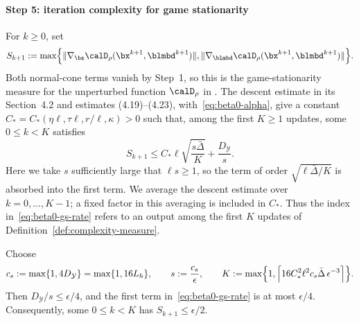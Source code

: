 \paragraph{Step 5: iteration complexity for game stationarity}
For \(k\ge0\), set
\[
S_{k+1}:=\max\Bigl\{
\|\nabla_{\bx}\calD_\rho(\bx^{k+1},\blmbd^{k+1})\|,
\|\nabla_{\blmbd}\calD_\rho(\bx^{k+1},\blmbd^{k+1})\|\Bigr\}.
\]
Both normal-cone terms vanish by Step~1, so this is the game-stationarity
measure for the unperturbed function \(\calD_\rho\) in
\cite[Theorem~3.3(i)]{li2026smoothing}.
The descent estimate in its Section~4.2 and estimates (4.19)--(4.23),
with~\eqref{eq:beta0-alpha}, give a constant
\(C_*=C_*(\eta\ell,\tau\ell,r/\ell,\kappa)>0\) such that, among the first
\(K\ge1\) updates, some \(0\le k<K\) satisfies
\begin{equation}
S_{k+1}\le C_*\ell\sqrt{\frac{s\bar\Delta}{K}}
+\frac{D_{\mathcal Y}}s.
\label{eq:beta0-gs-rate}
\end{equation}
Here we take \(s\) sufficiently large that \(\ell s\ge1\), so the
term of order \(\sqrt{\ell\bar\Delta/K}\) is absorbed into the first
term. We average the descent estimate over \(k=0,\ldots,K-1\);
a fixed factor in this averaging is included in \(C_*\).
Thus the index in~\eqref{eq:beta0-gs-rate} refers to an output among the
first \(K\) updates of Definition~\ref{def:complexity-measure}.

Choose
\begin{equation}
c_s:=\max\{1,4D_{\mathcal Y}\}=\max\{1,16L_h\},\qquad
s:=\frac{c_s}{\epsilon},\qquad
K:=\max\Bigl\{1,\Bigl\lceil
16C_*^2\ell^2c_s\bar\Delta\,\epsilon^{-3}
\Bigr\rceil\Bigr\}.
\label{eq:beta0-budget}
\end{equation}
Then \(D_{\mathcal Y}/s\le\epsilon/4\), and the first term
in~\eqref{eq:beta0-gs-rate} is at most \(\epsilon/4\).
Consequently, some \(0\le k<K\) has \(S_{k+1}\le\epsilon/2\).

